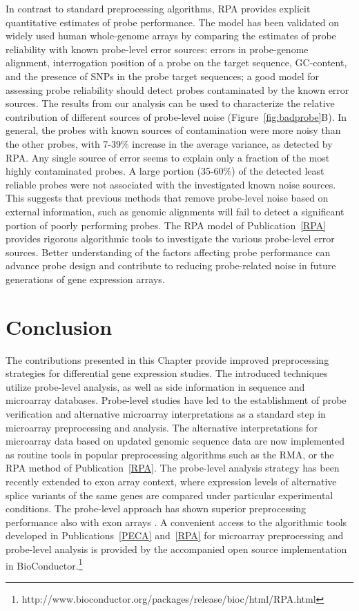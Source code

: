 In contrast to standard preprocessing algorithms, RPA provides
explicit quantitative estimates of probe performance. The model has
been validated on widely used human whole-genome arrays by comparing
the estimates of probe reliability with known probe-level error
sources: errors in probe-genome alignment, interrogation position of a
probe on the target sequence, GC-content, and the presence of SNPs in
the probe target sequences; a good model for assessing probe
reliability should detect probes contaminated by the known error
sources.  The results from our analysis can be used to characterize
the relative contribution of different sources of probe-level noise
(Figure~\ref{fig:badprobe}B). In general, the probes with known sources
of contamination were more noisy than the other probes, with 7-39\%
increase in the average variance, as detected by RPA.  Any single
source of error seems to explain only a fraction of the most highly
contaminated probes. A large portion (35-60\%) of the detected least
reliable probes were not associated with the investigated known noise
sources. This suggests that previous methods that remove probe-level
noise based on external information, such as genomic alignments will
fail to detect a significant portion of poorly performing probes.  The
RPA model of Publication~\ref{RPA} provides rigorous algorithmic tools
to investigate the various probe-level error sources. Better
understanding of the factors affecting probe performance can advance
probe design and contribute to reducing probe-related noise in future
generations of gene expression arrays.

\section{Conclusion}\label{sec:preconclusion}

The contributions presented in this Chapter provide improved
preprocessing strategies for differential gene expression studies. The
introduced techniques utilize probe-level analysis, as well as side
information in sequence and microarray databases.  Probe-level studies
have led to the establishment of probe verification and alternative
microarray interpretations as a standard step in microarray
preprocessing and analysis. The alternative interpretations for
microarray data based on updated genomic sequence data
\citep{Gautier04b, Dai05} are now implemented as routine tools in
popular preprocessing algorithms such as the RMA, or the RPA method of
Publication~\ref{RPA}. The probe-level analysis strategy has been
recently extended to exon array context, where expression levels of
alternative splice variants of the same genes are compared under
particular experimental conditions. The probe-level approach has shown
superior preprocessing performance also with exon arrays
\citep{Laajala2009}.  A convenient access to the algorithmic tools
developed in Publications~\ref{PECA} and~\ref{RPA} for microarray
preprocessing and probe-level analysis is provided by the accompanied
open source implementation in
BioConductor.\footnote{http://www.bioconductor.org/packages/release/bioc/html/RPA.html}


